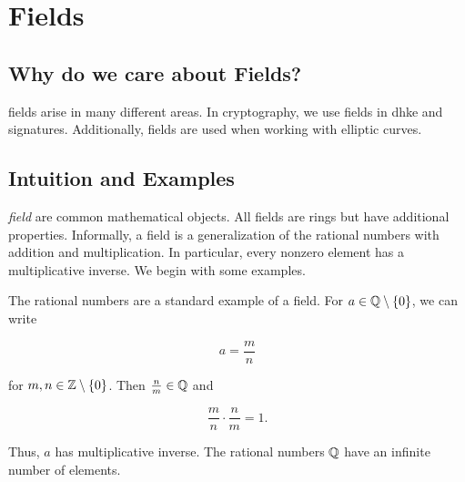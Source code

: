 \section{Fields}
\label{sec:math_fields}

\subsection{Why do we care about Fields?}
\Glspl{field} arise in many different areas.
In cryptography, we use \glspl{field} in \gls{dhke} and \glspl{signature}.
Additionally, \glspl{field} are used when working with \glspl{elliptic curve}.

\subsection{Intuition and Examples}
\emph{\Gls{field}} are common mathematical objects.
All \glspl{field} are \glspl{ring} but have additional properties.
Informally, a \gls{field} is a generalization of the rational numbers
with addition and multiplication.
In particular, every nonzero element has a multiplicative inverse.
We begin with some examples.

\begin{example}
The rational numbers are a standard example of a \gls{field}.
For $a\in\mathbb{Q}\setminus\left\{ 0 \right\}$, we can write

\begin{equation}
    a = \frac{m}{n}
\end{equation}

\noindent
for $m,n\in\mathbb{Z}\setminus\left\{ 0 \right\}$.
Then $\frac{n}{m}\in\mathbb{Q}$ and

\begin{equation}
    \frac{m}{n} \cdot \frac{n}{m} = 1.
\end{equation}

\noindent
Thus, $a$ has multiplicative inverse.
The rational numbers $\mathbb{Q}$ have an infinite number of elements.
\end{example}

